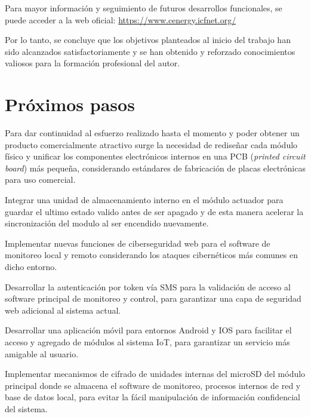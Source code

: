Para mayor información y seguimiento de futuros desarrollos funcionales, se puede acceder a la web oficial: \url{https://www.cenergy.icfnet.org/}

Por lo tanto, se concluye que los objetivos planteados al inicio del trabajo han sido alcanzados satisfactoriamente y se han obtenido y reforzado conocimientos valiosos para la formación profesional del autor.


\section{Próximos pasos}

Para dar continuidad al esfuerzo realizado hasta el momento y poder obtener un producto comercialmente atractivo surge la necesidad de rediseñar cada módulo físico y unificar los componentes electrónicos internos en una PCB (\emph{printed circuit board}) más pequeña, considerando estándares de fabricación de placas electrónicas para uso comercial.

Integrar una unidad de almacenamiento interno en el módulo actuador para guardar el ultimo estado valido antes de ser apagado y de esta manera acelerar la sincronización del modulo al ser encendido nuevamente.

Implementar nuevas funciones de ciberseguridad web para el software de monitoreo local y remoto considerando los ataques cibernéticos más comunes en dicho entorno.

Desarrollar la autenticación por token vía SMS para la validación de acceso al software principal de monitoreo y control, para garantizar una capa de seguridad web adicional al sistema actual.

Desarrollar una aplicación móvil para entornos Android y IOS para facilitar el acceso y agregado de módulos al sistema IoT, para garantizar un servicio más amigable al usuario.

Implementar mecanismos de cifrado de unidades internas del microSD del módulo principal donde se almacena el software de monitoreo, procesos internos de red y base de datos local, para evitar la fácil manipulación de información confidencial del sistema.

